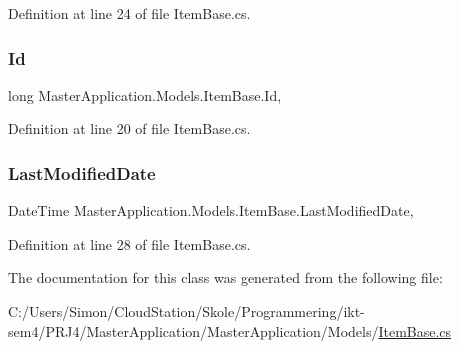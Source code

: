 Definition at line 24 of file Item\+Base.\+cs.

\mbox{\label{class_master_application_1_1_models_1_1_item_base_a05db6c74de6848c7ee8b563d8d9764cc}} 
\subsubsection{\texorpdfstring{Id}{Id}}
{\footnotesize\ttfamily long Master\+Application.\+Models.\+Item\+Base.\+Id\hspace{0.3cm}{\ttfamily [get]}, {\ttfamily [set]}}



Definition at line 20 of file Item\+Base.\+cs.

\mbox{\label{class_master_application_1_1_models_1_1_item_base_a468781bbd7d128446bf85096fc61b6d0}} 
\subsubsection{\texorpdfstring{Last\+Modified\+Date}{LastModifiedDate}}
{\footnotesize\ttfamily Date\+Time Master\+Application.\+Models.\+Item\+Base.\+Last\+Modified\+Date\hspace{0.3cm}{\ttfamily [get]}, {\ttfamily [set]}}



Definition at line 28 of file Item\+Base.\+cs.



The documentation for this class was generated from the following file\+:\begin{DoxyCompactItemize}
\item 
C\+:/\+Users/\+Simon/\+Cloud\+Station/\+Skole/\+Programmering/ikt-\/sem4/\+P\+R\+J4/\+Master\+Application/\+Master\+Application/\+Models/\mbox{\hyperlink{_master_application_2_master_application_2_models_2_item_base_8cs}{Item\+Base.\+cs}}\end{DoxyCompactItemize}
